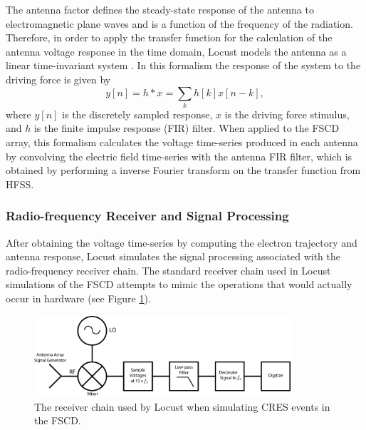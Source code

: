 The antenna factor defines the steady-state response of the antenna to electromagnetic plane waves and is a function of the frequency of the radiation. Therefore, in order to apply the transfer function for the calculation of the antenna voltage response in the time domain, Locust models the antenna as a linear time-invariant system \cite{lti_theory_wiki}. In this formalism the response of the system to the driving force is given by 
\begin{equation}
    y[n] = h\ast x=\sum_{k}{h[k]x[n-k]},
\end{equation}
where $y[n]$ is the discretely sampled response, $x$ is the driving force stimulus, and $h$ is the finite impulse response (FIR) filter. When applied to the FSCD array, this formalism calculates the voltage time-series produced in each antenna by convolving the electric field time-series with the antenna FIR filter, which is obtained by performing a inverse Fourier transform on the transfer function from HFSS. 

\subsubsection*{Radio-frequency Receiver and Signal Processing}

After obtaining the voltage time-series by computing the electron trajectory and antenna response, Locust simulates the signal processing associated with the radio-frequency receiver chain. The standard receiver chain used in Locust simulations of the FSCD attempts to mimic the operations that would actually occur in hardware (see Figure \ref{fig:chap4-locust-receiver-chain}). 

\begin{figure}[htbp]
    \centering
    \includegraphics[width=0.85\textwidth]{figs/Chapter-4/230511_locust_receiver_chain.png}
    \caption{The receiver chain used by Locust when simulating CRES events in the FSCD.}
\label{fig:chap4-locust-receiver-chain}
\end{figure}

